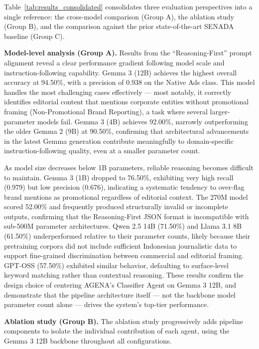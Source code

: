 \documentclass{ieeeaccess}
\begin{document}
Table~\ref{tab:results_consolidated} consolidates three evaluation perspectives into a single reference: the cross-model comparison (Group A), the ablation study (Group B), and the comparison against the prior state-of-the-art SENADA baseline (Group C).

\textbf{Model-level analysis (Group A).} Results from the ``Reasoning-First'' prompt alignment reveal a clear performance gradient following model scale and instruction-following capability. Gemma 3 (12B) achieves the highest overall accuracy at 94.50\%, with a precision of 0.938 on the Native Ads class. This model handles the most challenging cases effectively --- most notably, it correctly identifies editorial content that mentions corporate entities without promotional framing (Non-Promotional Brand Reporting), a task where several larger-parameter models fail. Gemma 3 (4B) achieves 92.00\%, narrowly outperforming the older Gemma 2 (9B) at 90.50\%, confirming that architectural advancements in the latest Gemma generation contribute meaningfully to domain-specific instruction-following quality, even at a smaller parameter count.

As model size decreases below 1B parameters, reliable reasoning becomes difficult to maintain. Gemma 3 (1B) dropped to 76.50\%, exhibiting very high recall (0.979) but low precision (0.676), indicating a systematic tendency to over-flag brand mentions as promotional regardless of editorial context. The 270M model scored 52.00\% and frequently produced structurally invalid or incomplete outputs, confirming that the Reasoning-First JSON format is incompatible with sub-500M parameter architectures. Qwen 2.5 14B (71.50\%) and Llama 3.1 8B (61.50\%) underperformed relative to their parameter counts, likely because their pretraining corpora did not include sufficient Indonesian journalistic data to support fine-grained discrimination between commercial and editorial framing. GPT-OSS (57.50\%) exhibited similar behavior, defaulting to surface-level keyword matching rather than contextual reasoning. These results confirm the design choice of centering AGENA's Classifier Agent on Gemma 3 12B, and demonstrate that the pipeline architecture itself --- not the backbone model parameter count alone --- drives the system's top-tier performance.

\textbf{Ablation study (Group B).} The ablation study progressively adds pipeline components to isolate the individual contribution of each agent, using the Gemma 3 12B backbone throughout all configurations.
\end{document}
